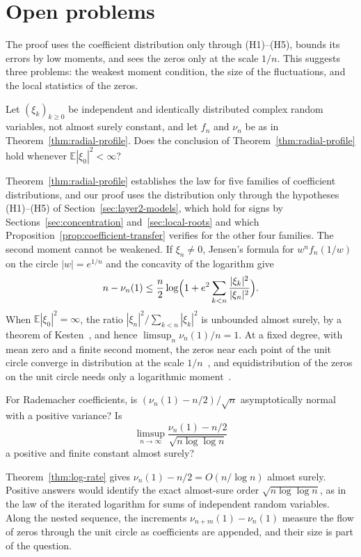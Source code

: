 \section{Open problems}\label{sec:open-problems}
The proof uses the coefficient distribution only through (H1)--(H5),
bounds its errors by low moments, and sees the zeros only at the scale
$1/n$. This suggests three problems: the weakest moment condition, the
size of the fluctuations, and the local statistics of the zeros.

\begin{problem}\label{prob:threshold}
Let $(\xi_k)_{k\ge0}$ be independent and identically distributed complex
random variables, not almost surely constant, and let $f_n$ and $\nu_n$ be
as in Theorem~\ref{thm:radial-profile}. Does the conclusion of
Theorem~\ref{thm:radial-profile} hold whenever $\mathbb E|\xi_0|^2<\infty$?
\end{problem}

Theorem~\ref{thm:radial-profile} establishes the law for five families of
coefficient distributions, and our proof uses the distribution only through
the hypotheses (H1)--(H5) of Section~\ref{sec:layer2-models}, which hold
for signs by Sections~\ref{sec:concentration} and~\ref{sec:local-roots}
and which Proposition~\ref{prop:coefficient-transfer} verifies for the
other four families.
The second moment cannot be weakened.
If $\xi_n\ne0$, Jensen's formula for $w^nf_n(1/w)$ on the circle
$|w|=e^{1/n}$ and the concavity of the logarithm give
\[
 n-\nu_n(1)\le\frac n2\log\Bigl(1+e^2\sum_{k<n}\frac{|\xi_k|^2}{|\xi_n|^2}\Bigr).
\]
When $\mathbb E|\xi_0|^2=\infty$, the ratio $|\xi_n|^2/\sum_{k<n}|\xi_k|^2$
is unbounded almost surely, by a theorem of Kesten~\cite{Kesten1970}, and
hence $\limsup_n\nu_n(1)/n=1$.
At a fixed degree, with mean zero and a finite second moment, the zeros
near each point of the unit circle converge in distribution at the scale
$1/n$~\cite{KabluchkoKhoruzhenkoMarynych2025}, and equidistribution of the
zeros on the unit circle needs only a logarithmic
moment~\cite{IbragimovZaporozhets2013}.

\begin{problem}[Fluctuations]\label{prob:fluctuations}
For Rademacher coefficients, is $(\nu_n(1)-n/2)/\sqrt n$ asymptotically
normal with a positive variance? Is
\[
 \limsup_{n\to\infty}\frac{\nu_n(1)-n/2}{\sqrt{n\log\log n}}
\]
a positive and finite constant almost surely?
\end{problem}

Theorem~\ref{thm:log-rate} gives $\nu_n(1)-n/2=O(n/\log n)$ almost surely.
Positive answers would identify the exact almost-sure order
$\sqrt{n\log\log n}$, as in the law of the iterated logarithm for sums of
independent random variables.
Along the nested sequence, the increments $\nu_{n+m}(1)-\nu_n(1)$ measure
the flow of zeros through the unit circle as coefficients are appended,
and their size is part of the question.

